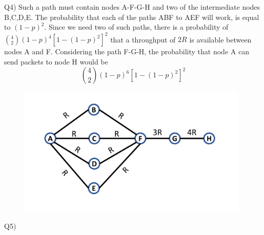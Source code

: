 \documentclass[10pt,letterpaper]{article}
\begin{document}
Q4) Such a path must contain nodes A-F-G-H and two of the intermediate nodes B,C,D,E. The probability that each of the paths ABF to AEF will work, is equal to $(1-p)^2$. Since we need two of such paths, there is a probability of $\binom{4}{2}(1-p)^4[1-(1-p)^2]^2$ that a throughput of $2R$ is available between nodes A and F. Considering the path F-G-H, the probability that node A can send packets to node H would be $$\binom{4}{2}(1-p)^6[1-(1-p)^2]^2$$
\begin{figure}[ht]
\centering
\includegraphics[width=110mm]{Q5}
\end{figure}

Q5)
\end{document}
